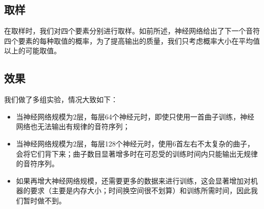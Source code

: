 \documentclass{article}
\begin{document}
  \subsection{取样}
    在取样时，我们对四个要素分别进行取样。如前所述，神经网络给出了下一个音符四个要素的每种取值的概率，为了提高输出的质量，我们只考虑概率大小在平均值以上的可能取值。
  \subsection{效果}
  \label{result_of_CompoNet}
    我们做了多组实验，情况大致如下：
    \begin{itemize}
    \item 当神经网络规模为2层，每层64个神经元时，即使只使用一首曲子训练，神经网络也无法输出有规律的音符序列；
    \item 当神经网络规模为2层，每层128个神经元时，使用6首左右不太复杂的曲子，会将它们背下来；曲子数目显著增多时在可忍受的训练时间内只能输出无规律的音符序列。
    \item 如果再增大神经网络规模，还需要更多的数据来进行训练，这会显著增加对机器的要求（主要是内存大小；时间换空间很不划算）和训练所需时间，因此我们暂时做不到。
    \end{itemize}

\ifx \allfiles \undefined
\end{document}
